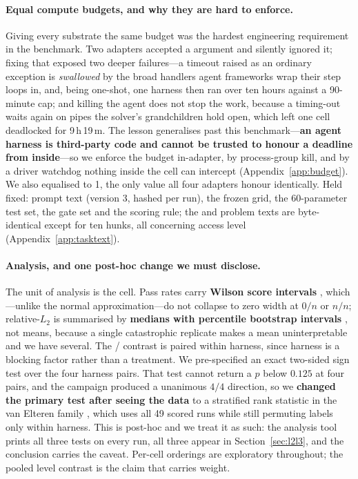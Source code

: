 \paragraph{Equal compute budgets, and why they are hard to enforce.}
Giving every substrate the same budget was the hardest engineering requirement
in the benchmark. Two adapters accepted a  argument and
silently ignored it; fixing that exposed two deeper failures---a timeout raised
as an ordinary exception is \emph{swallowed} by the broad 
handlers agent frameworks wrap their step loops in, and, 
being one-shot, one harness then ran over ten hours against a 90-minute cap; and
killing the agent does not stop the work, because a timing-out
 waits again on pipes the solver's grandchildren hold open,
which left one cell deadlocked for 9\,h\,19\,m. The lesson generalises past this
benchmark---\textbf{an agent harness is third-party code and cannot be trusted
to honour a deadline from inside}---so we enforce the budget in-adapter, by
process-group kill, and by a driver watchdog nothing inside the cell can
intercept (Appendix~\ref{app:budget}). We also equalised 
to 1, the only value all four adapters honour identically. Held fixed: prompt
text (version 3, hashed per run), the frozen grid, the 60-parameter test set,
the gate set and the scoring rule; the \Ltwo{} and \Lthree{} problem texts are
byte-identical except for ten hunks, all concerning access level
(Appendix~\ref{app:tasktext}).

\paragraph{Analysis, and one post-hoc change we must disclose.}
The unit of analysis is the cell. Pass rates carry \textbf{Wilson score
intervals} \citep{wilson1927probable}, which---unlike the normal
approximation---do not collapse to zero width at $0/n$ or $n/n$; relative-$L_2$
is summarised by \textbf{medians with percentile bootstrap intervals}
\citep{efron1979bootstrap}, not means, because a single catastrophic replicate
makes a mean uninterpretable and we have several. The \Ltwo{}/\Lthree{} contrast
is paired within harness, since harness is a blocking factor rather than a
treatment. We pre-specified an exact two-sided sign test over the four harness
pairs. That test cannot return a $p$ below $0.125$ at four pairs, and the
campaign produced a unanimous $4/4$ direction, so we \textbf{changed the primary
test after seeing the data} to a stratified rank statistic in the van Elteren
family \citep{vanelteren1960combination}, which uses all 49 scored runs while
still permuting labels only within harness. This is post-hoc and we treat it as
such: the analysis tool prints all three tests on every run, all three appear in
Section~\ref{sec:l2l3}, and the conclusion carries the caveat. Per-cell
orderings are exploratory throughout; the pooled level contrast is the claim
that carries weight.
